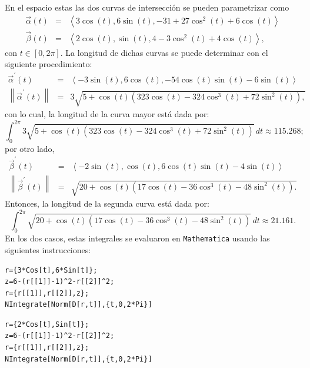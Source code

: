 En el espacio estas las dos curvas de intersección se pueden parametrizar como
\begin{eqnarray*}
\overrightarrow{\alpha }(t) &=& \left\langle 3\cos (t) ,6\sin
(t) ,-31+27\cos ^{2}(t) +6\cos (t) \right\rangle \\
\overrightarrow{\beta }(t) &=& \left\langle 2\cos (t) ,\sin \left(
t\right) ,4-3\cos ^{2}(t) +4\cos (t) \right\rangle,
\end{eqnarray*}
con $t \in [0,2\pi]$.
La longitud de dichas curvas se puede determinar con el
siguiente procedimiento:
\begin{eqnarray*}
\overrightarrow{\alpha }^{\prime }(t)&=& \left\langle -3\sin (t),6\cos (t) ,-54\cos (t) \sin (t)
-6\sin (t) \right\rangle \\
\left\| \overrightarrow{\alpha }^{\prime }(t)\right\|
&=&  3\sqrt{5+\cos (t) \left( 323\cos(t) -324\cos ^{3}(t) +72\sin ^{2}(t)\right),}
\end{eqnarray*}
con lo cual, la longitud de la curva mayor está dada por:
\[\int_{0}^{2\pi}3\sqrt{5+\cos (t) \left( 323\cos(t) -324\cos ^{3}(t) +72\sin ^{2}(t)\right) }  \,  dt\approx 115. 268;\]
por otro lado,
\begin{eqnarray*}
\overrightarrow{\beta }^{\prime }(t)&=& \left\langle -2\sin \left(
t\right) ,\cos (t) ,6\cos (t) \sin (t)-4\sin (t) \right\rangle \\
\left\| \overrightarrow{\beta }^{\prime }(t)\right\|
&=& \sqrt{20+\cos (t) \left( 17\cos (t)-36\cos ^{3}(t) -48\sin ^{2}(t) \right).}
\end{eqnarray*}
Entonces, la longitud de la segunda curva está dada por:
\[\int_{0}^{2\pi}\sqrt{20+\cos (t) \left( 17\cos (t)-36\cos ^{3}(t) -48\sin ^{2}(t) \right)} \, dt\approx 21.161.\]
En los dos casos, estas integrales se evaluaron en \verb"Mathematica"
usando las siguientes instrucciones:

\begin{tcolorbox}[title=\bf Instrucción \verb"Mathematica"]
\begin{Verbatim}[formatcom=\letraverbatim]
r={3*Cos[t],6*Sin[t]};
z=6-(r[[1]]-1)^2-r[[2]]^2;
r={r[[1]],r[[2]],z};
NIntegrate[Norm[D[r,t]],{t,0,2*Pi}]
\end{Verbatim}
\end{tcolorbox}

\begin{tcolorbox}[title=\bf Instrucción \verb"Mathematica"]
\begin{Verbatim}[formatcom=\letraverbatim]
r={2*Cos[t],Sin[t]};
z=6-(r[[1]]-1)^2-r[[2]]^2;
r={r[[1]],r[[2]],z};
NIntegrate[Norm[D[r,t]],{t,0,2*Pi}]
\end{Verbatim}
\end{tcolorbox}

